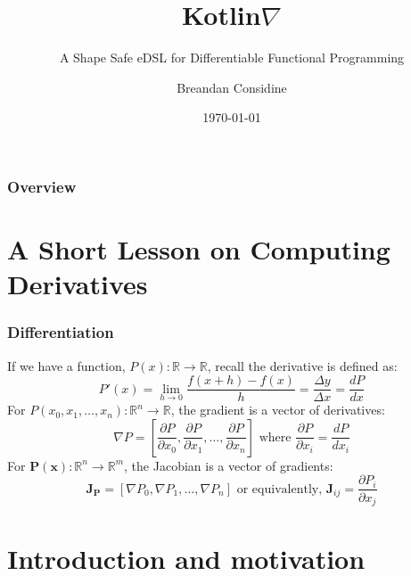 \documentclass{beamer}
\title{Kotlin\texorpdfstring{$\nabla$}{}}
\subtitle{A Shape Safe eDSL for Differentiable Functional Programming}
\author{Breandan Considine}
\institute[UdeM]{
Universit\'e de Montr\'eal \\
\medskip
\textit{breandan.considine@umontreal.ca}
}
\date{\today}
\begin{document}
    \begin{frame}
        \titlepage
    \end{frame}

    \begin{frame}
        \frametitle{Overview}
        \tableofcontents
    \end{frame}

    \section{A Short Lesson on Computing Derivatives}\label{sec:second-section}


    \begin{frame}
        \frametitle{Differentiation}
        If we have a function, $P(x): \mathbb{R}\rightarrow\mathbb{R}$, recall the derivative is defined as:
        \begin{equation}
            P'(x) = \lim _{h\to 0}{\frac {f(x+h)-f(x)}{h}} = \frac{\Delta y}{\Delta x} = \frac{dP}{dx}
        \end{equation}
        For $P(x_0, x_1, \dots, x_n): \mathbb{R}^n\rightarrow\mathbb{R}$, the gradient is a vector of derivatives:
        \begin{equation}
            \nabla P = \left[\frac{\partial P}{\partial x_0}, \frac{\partial P}{\partial x_1}, \dots, \dfrac{\partial P}{\partial x_n}\right]\text{ where }\frac{\partial P}{\partial x_i} = \frac{dP}{dx_i}
        \end{equation}
        For $\mathbf{P}(\mathbf{x}): \mathbb{R}^n\rightarrow\mathbb{R}^m$, the Jacobian is a vector of gradients:
        \begin{equation}
            \mathbf{J}_\mathbf{P} = \left[\nabla P_0, \nabla P_1, \dots, \nabla P_n \right] \text{ or equivalently, } \mathbf{J}_{ij} = \frac{\partial P_i}{\partial x_j}
        \end{equation}
    \end{frame}


    \section{Introduction and motivation}\label{sec:first-section}
\end{document}

